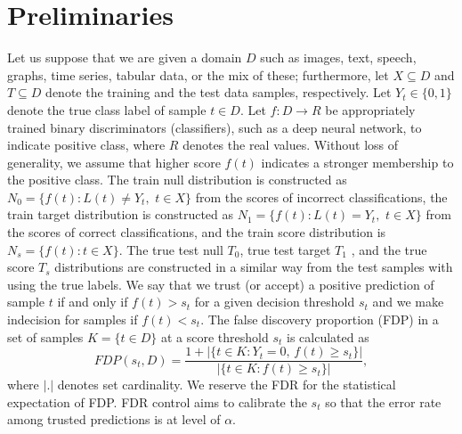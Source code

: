 \documentclass{article}
\begin{document}
\section{Preliminaries}

Let us suppose that we are given a domain $D$ such as images, text, speech, graphs, time series, tabular data, or the mix of these; furthermore, let $X\subseteq D$ and $T\subseteq D$ denote the training and  the test data samples, respectively. Let $Y_t\in\{0,1\}$ denote the true class label of sample $t\in D$. Let $f:D\rightarrow R$ be appropriately trained binary discriminators (classifiers), such as a deep neural network, to indicate positive class, where $R$ denotes the real values. Without loss of generality, we assume that higher score $f(t)$ indicates a stronger membership to the positive class. The train null distribution is constructed as $N_0=\{f(t): L(t) \ne Y_t,\,\,  t\in X\}$ from the scores of incorrect classifications, the train target distribution is constructed as $N_1=\{f(t): L(t) = Y_t,\,\,  t\in X\}$ from the scores of correct classifications, and the train score distribution is $N_s=\{f(t): t\in X\}$. The true test null $T_0$, true test target $T_1$ , and the true score $T_s$ distributions are constructed in a similar way from the test samples with using the true labels. We say that we trust (or accept) a positive prediction of sample $t$ if and only if $f(t)>s_t$ for a given decision threshold  $s_t$ and we make indecision for samples if $f(t) < s_t$. The false discovery proportion (FDP) in a set of samples $K=\{t\in D\}$ at a score threshold $s_t$ is calculated as 
\begin{equation*}
	FDP(s_t,D)=\frac{1+|\{t\in K: Y_t=0,\,f(t)\ge s_t\}|}{|\{t\in K:f(t)\ge s_t\}|},
\end{equation*}
\noindent where $|.|$ denotes set cardinality. We reserve the FDR for the statistical expectation of FDP. FDR control aims to calibrate the $s_t$ so that the error rate among trusted predictions is at level of $\alpha$. %

\end{document}
